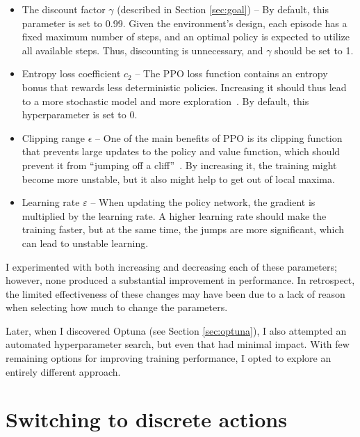 \documentclass[
  digital,     %
  oneside,     %
  nosansbold,  %
  nocolorbold, %
  lof,         %
  lot,         %
]{fithesis4}
\begin{document}
\begin{itemize}
    \item The discount factor $\gamma$ (described in Section \ref{sec:goal}) -- By default, this parameter is set to 0.99. Given the environment’s design, each episode has a fixed maximum number of steps, and an optimal policy is expected to utilize all available steps. Thus, discounting is unnecessary, and $\gamma$ should be set to 1.
    \item Entropy loss coefficient $c_2$ -- The PPO loss function contains an entropy bonus that rewards less deterministic policies. Increasing it should thus lead to a more stochastic model and more exploration~\cite{PPO_paper}. By default, this hyperparameter is set to 0.
    \item Clipping range $\epsilon$ -- One of the main benefits of PPO is its clipping function that prevents large updates to the policy and value function, which should prevent it from \enquote{jumping off a cliff}~\cite{PPO_paper}. By increasing it, the training might become more unstable, but it also might help to get out of local maxima.
    \item Learning rate $\varepsilon$ -- When updating the policy network, the gradient is multiplied by the learning rate. A higher learning rate should make the training faster, but at the same time, the jumps are more significant, which can lead to unstable learning.
\end{itemize}

I experimented with both increasing and decreasing each of these parameters; however, none produced a substantial improvement in performance. In retrospect, the limited effectiveness of these changes may have been due to a lack of reason when selecting how much to change the parameters.

Later, when I discovered Optuna (see Section \ref{sec:optuna}), I also attempted an automated hyperparameter search, but even that had minimal impact. With few remaining options for improving training performance, I opted to explore an entirely different approach.

\section{Switching to discrete actions}
\label{sec:iterative}
\end{document}
